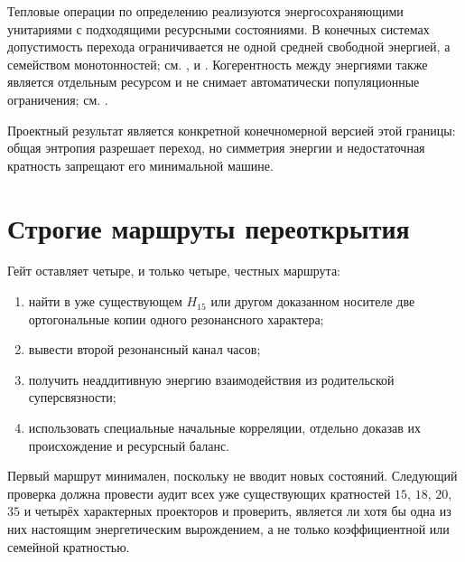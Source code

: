 Тепловые операции по определению реализуются энергосохраняющими унитариями
с подходящими ресурсными состояниями. В конечных системах допустимость
перехода ограничивается не одной средней свободной энергией, а семейством
монотонностей; см. ,
 и .
Когерентность между энергиями также является отдельным ресурсом и не
снимает автоматически популяционные ограничения; см.
.

Проектный результат является конкретной конечномерной версией этой
границы: общая энтропия разрешает переход, но симметрия энергии и
недостаточная кратность запрещают его минимальной машине.

\section{Строгие маршруты переоткрытия}

Гейт оставляет четыре, и только четыре, честных маршрута:
\begin{enumerate}
 \item найти в уже существующем $H_{15}$ или другом доказанном носителе
 две ортогональные копии одного резонансного характера;
 \item вывести второй резонансный канал часов;
 \item получить неаддитивную энергию взаимодействия из родительской
 суперсвязности;
 \item использовать специальные начальные корреляции, отдельно доказав
 их происхождение и ресурсный баланс.
\end{enumerate}

Первый маршрут минимален, поскольку не вводит новых состояний. Следующий
проверка должна провести аудит всех уже существующих кратностей $15$, $18$,
$20$, $35$ и четырёх характерных проекторов и проверить, является ли хотя
бы одна из них настоящим энергетическим вырождением, а не только
коэффициентной или семейной кратностью.

